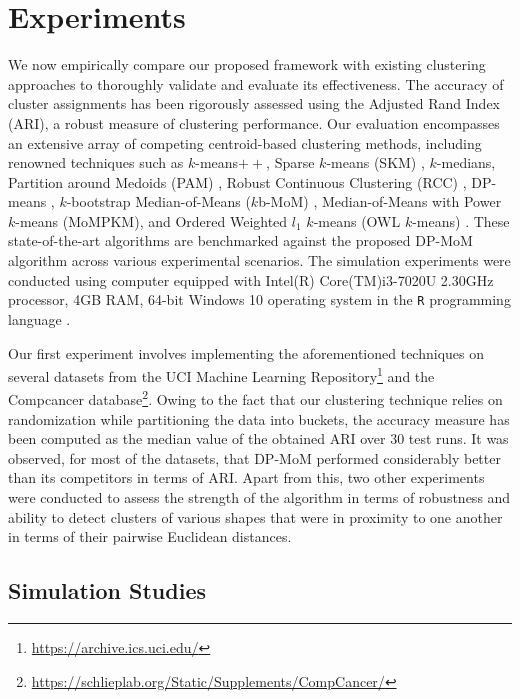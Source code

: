 \documentclass[11pt]{article}
\begin{document}
\section{Experiments}
\label{sec:experiments}
We now empirically compare our proposed framework with existing clustering approaches to thoroughly validate and evaluate its effectiveness. The accuracy of cluster assignments has been rigorously assessed using the Adjusted Rand Index (ARI), a robust measure of clustering performance.
Our evaluation encompasses an extensive array of competing centroid-based clustering methods, including renowned techniques such as $k$-means$++$, Sparse $k$-means (SKM) \citep{SKM-paper}, $k$-medians, Partition around Medoids (PAM) \citep{PAM-paper}, Robust Continuous Clustering (RCC) \citep{Shah2017-jj}, DP-means \citep{DP-Means}, $k$-bootstrap Median-of-Means ($k$b-MoM) \citep{brunetsaumard2020kbmom}, Median-of-Means with Power $k$-means (MoMPKM), and Ordered Weighted $l_1$ $k$-means (OWL $k$-means) \citep{pmlr-v206-chakraborty23a}. These state-of-the-art algorithms are benchmarked against the proposed DP-MoM algorithm across various experimental scenarios. The simulation experiments were conducted using computer equipped with Intel(R) Core(TM)i3-7020U  2.30GHz  processor, 4GB RAM, 64-bit Windows 10 operating  system in the \texttt{R} programming language \citep{R-lang}.

Our first experiment involves implementing the aforementioned techniques on several datasets from the UCI Machine Learning Repository\footnote{\url{https://archive.ics.uci.edu/}} and the Compcancer database\footnote{\url{https://schlieplab.org/Static/Supplements/CompCancer/}}. Owing to the fact that our clustering technique relies on randomization while partitioning the data into buckets, the accuracy measure has been computed as the median value of the obtained ARI over $30$ test runs. It was observed, for most of the datasets, that DP-MoM performed considerably better than its competitors in terms of ARI. Apart from this, two other experiments were conducted to assess the strength of the algorithm in terms of robustness and ability to detect clusters of various shapes that were in proximity to one another in terms of their pairwise Euclidean distances.


\subsection{Simulation Studies}
\end{document}

